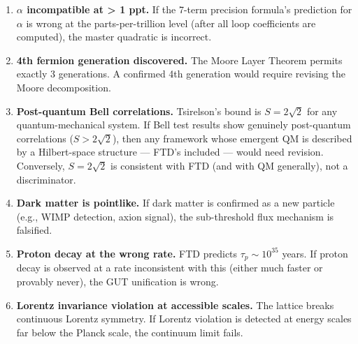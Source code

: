 \documentclass[
  11pt,
  letterpaper,
  twoside,
  openright]{book}
\begin{document}
\begin{tcolorbox}[enhanced jigsaw, coltitle=black, colbacktitle=quarto-callout-important-color!10!white, toprule=.15mm, colframe=quarto-callout-important-color-frame, arc=.35mm, opacityback=0, bottomtitle=1mm, toptitle=1mm, breakable, colback=white, titlerule=0mm, opacitybacktitle=0.6, title=\textcolor{quarto-callout-important-color}{\faExclamation}\hspace{0.5em}{What would kill FTD}, rightrule=.15mm, bottomrule=.15mm, leftrule=.75mm, left=2mm]

\begin{enumerate}
\def\labelenumi{\arabic{enumi}.}
\item
  \textbf{\(\alpha\) incompatible at \textgreater{} 1 ppt.} If the
  7-term precision formula's prediction for \(\alpha\) is wrong at the
  parts-per-trillion level (after all loop coefficients are computed),
  the master quadratic is incorrect.
\item
  \textbf{4th fermion generation discovered.} The Moore Layer Theorem
  permits exactly 3 generations. A confirmed 4th generation would
  require revising the Moore decomposition.
\item
  \textbf{Post-quantum Bell correlations.} Tsirelson's bound is
  \(S = 2\sqrt{2}\) for any quantum-mechanical system. If Bell test
  results show genuinely post-quantum correlations (\(S > 2\sqrt{2}\)),
  then any framework whose emergent QM is described by a Hilbert-space
  structure --- FTD's included --- would need revision. Conversely,
  \(S = 2\sqrt{2}\) is consistent with FTD (and with QM generally), not
  a discriminator.
\item
  \textbf{Dark matter is pointlike.} If dark matter is confirmed as a
  new particle (e.g., WIMP detection, axion signal), the sub-threshold
  flux mechanism is falsified.
\item
  \textbf{Proton decay at the wrong rate.} FTD predicts
  \(\tau_p \sim 10^{35}\) years. If proton decay is observed at a rate
  inconsistent with this (either much faster or provably never), the GUT
  unification is wrong.
\item
  \textbf{Lorentz invariance violation at accessible scales.} The
  lattice breaks continuous Lorentz symmetry. If Lorentz violation is
  detected at energy scales far below the Planck scale, the continuum
  limit fails.
\end{enumerate}

\end{tcolorbox}
\end{document}
